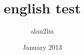 \documentclass[a4paper,12pt]{book}
\begin{document}
\author{alan2lin}
\title{english test}
\date{January 2013}

\frontmatter
\maketitle
\tableofcontents

\mainmatter



\backmatter
\end{document}
